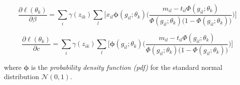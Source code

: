 \begin{equation} \label{derivative-b-f}
	\frac{\partial \ell(\theta_{k})}{\partial \beta} =  \sum_{i}  \gamma(z_{ik}) \sum_{l} \bigg[ x_{il} \mathbf{\phi}(g_{il};\theta_{k})\bigg(\frac{m_{il} - t_{il}\Phi(g_{il};\theta_{k})}{\Phi(g_{il};\theta_{k})\big(1-\Phi(g_{il};\theta_{k})\big)} \bigg) \bigg]
\end{equation}

\begin{equation} \label{derivative-c-f}
	\frac{\partial \ell(\theta_{k})}{\partial c} =  \sum_{i}  \gamma(z_{ik}) \sum_{l} \bigg[ \mathbf{\phi}(g_{il};\theta_{k})\bigg(\frac{m_{il} - t_{il}\Phi(g_{il};\theta_{k})}{\Phi(g_{il};\theta_{k})\big(1-\Phi(g_{il};\theta_{k})\big)} \bigg) \bigg]
\end{equation}

where $\mathbf{\phi}$ is the \emph{probability density function (pdf)} for the standard normal distribution $\mathcal{N}(0,1)$.